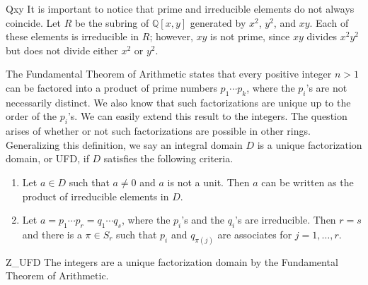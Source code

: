 \begin{example}{Qxy}
It is important to notice that prime and irreducible elements do not
always coincide. Let $R$ be the subring of ${\mathbb Q}[x, y]$ generated
by $x^2$, $y^2$, and $xy$.  Each of these elements is irreducible in
$R$; however, $xy$ is not prime, since $xy$ divides $x^2 y^2$ but does
not divide either $x^2$ or $y^2$.
\end{example}
 
 
The Fundamental Theorem of Arithmetic states that every positive
integer $n >1$ can be factored into a product of prime numbers $p_1
\cdots p_k$, where the $p_i$'s are not necessarily distinct. We also
know that such factorizations are unique up to the order of the
$p_i$'s. We can easily extend this result to the integers. The
question arises of whether or not such factorizations are possible in
other rings.  Generalizing this definition, we say an integral domain
$D$ is a {\bfi unique factorization domain}, or {\bfi
UFD}, if $D$ satisfies the following criteria.  
\begin{enumerate}
 
\item
Let $a \in D$ such that $a \neq 0$ and $a$ is not a unit.
Then $a$ can be written as the product of irreducible
elements in $D$.
 
\item %
Let $a = p_1 \cdots p_r = q_1 \cdots q_s$, where the $p_i$'s and the
$q_i$'s are irreducible. Then $r=s$ and there is a $\pi \in S_r$ such
that $p_i$ and $q_{\pi(j)}$ are associates for \mbox{$j = 1, \ldots, r$}. 
 
\end{enumerate}


\begin{example}{Z_UFD}
The integers are a unique factorization domain by the Fundamental
Theorem of Arithmetic.
\end{example}
 


